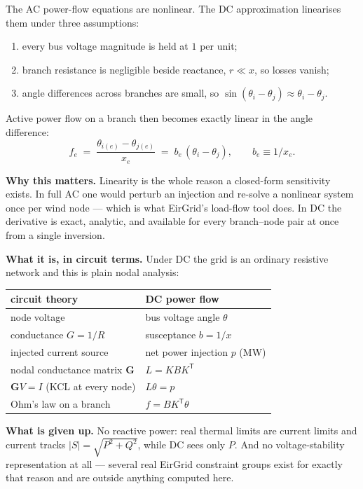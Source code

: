 \documentclass[11pt,a4paper]{article}
\newcommand{\T}{^{\mathsf{T}}}
\begin{document}
The AC power-flow equations are nonlinear. The DC approximation linearises them
under three assumptions:
\begin{enumerate}\itemsep0pt
  \item every bus voltage magnitude is held at $1$ per unit;
  \item branch resistance is negligible beside reactance, $r \ll x$, so losses vanish;
  \item angle differences across branches are small, so $\sin(\theta_i-\theta_j)\approx\theta_i-\theta_j$.
\end{enumerate}

Active power flow on a branch then becomes exactly linear in the angle difference:
\begin{equation}
  f_e \;=\; \frac{\theta_{i(e)} - \theta_{j(e)}}{x_e}
       \;=\; b_e\,(\theta_{i} - \theta_{j}),
  \qquad b_e \equiv 1/x_e .
\end{equation}

\textbf{Why this matters.} Linearity is the whole reason a closed-form
sensitivity exists. In full AC one would perturb an injection and re-solve a
nonlinear system once per wind node --- which is what EirGrid's load-flow tool
does. In DC the derivative is exact, analytic, and available for every
branch--node pair at once from a single inversion.

\medskip
\textbf{What it is, in circuit terms.} Under DC the grid is an ordinary
resistive network and this is plain nodal analysis:

\begin{center}\small
\begin{tabular}{ll}
\toprule
circuit theory & DC power flow\\
\midrule
node voltage & bus voltage angle $\theta$\\
conductance $G = 1/R$ & susceptance $b = 1/x$\\
injected current source & net power injection $p$ (MW)\\
nodal conductance matrix $\mathbf{G}$ & $L = K B K\T$\\
$\mathbf{G}V = I$ (KCL at every node) & $L\theta = p$\\
Ohm's law on a branch & $f = B K\T \theta$\\
\bottomrule
\end{tabular}
\end{center}

\medskip
\textbf{What is given up.} No reactive power: real thermal limits are current
limits and current tracks $|S| = \sqrt{P^2+Q^2}$, while DC sees only $P$. And
no voltage-stability representation at all --- several real EirGrid constraint
groups exist for exactly that reason and are outside anything computed here.
\end{document}
